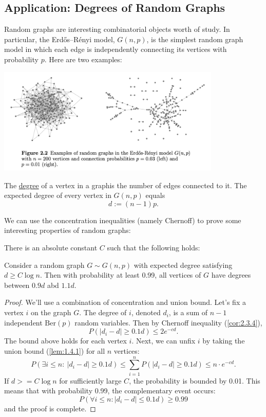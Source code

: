 \subsection{Application: Degrees of Random Graphs}
Random graphs are interesting combinatorial objects worth of study. In particular, the Erdős–Rényi model, 
$G(n, p)$, is the simplest random graph model in which each edge is independently connecting its vertices 
with probability $p$. Here are two examples: 
\begin{center}
	\includegraphics[width=0.8\textwidth]{Chapter 2/fig2-2.png}
\end{center}

The \underline{degree} of a vertex in a graphis the number of edges connected to it. The expected degree of
every vertex in $G(n, p)$ equals 
\[ d := (n - 1)p. \]

We can use the concentration inequalities (namely Chernoff) to prove some interesting properties of random 
graphs:

\begin{proposition}
\label{prop:2.5.1}
There is an absolute constant $C$ such that the following holds:

Consider a random graph $G \sim G(n, p)$ with expected degree satisfying $d \geq C \log{n}$. Then with 
probability at least 0.99, all vertices of $G$ have degrees between $0.9d$ abd $1.1d$.
\end{proposition}

\begin{proof}
We'll use a combination of concentration and union bound. Let's fix a vertex $i$ on the graph $G$. The 
degree of $i$, denoted $d_i$, is a sum of $n - 1$ independent $\mathrm{Ber}(p)$ random variables. Then by 
Chernoff inequality (\cref{cor:2.3.4}), 
\[ P(|d_i - d| \geq 0.1d) \leq 2e^{-cd}. \]
The bound above holds for each vertex $i$. Next, we can unfix $i$ by taking the union bound (\cref{lem:1.4.1}) 
for all $n$ vertices:
\[ P(\exists i \leq n: \ |d_i - d| \geq 0.1 d) \leq \sum_{i = 1}^{n} P(|d_i - d| \geq 0.1d) 
\leq n \cdot e^{-cd}. \]
If $d >= C \log{n}$ for sufficiently large $C$, the probability is bounded by 0.01. This means that with 
probability 0.99, the complementary event occurs: 
\[ P(\forall i \leq n: |d_i - d| \leq 0.1d) \geq 0.99 \]
and the proof is complete.
\end{proof}

